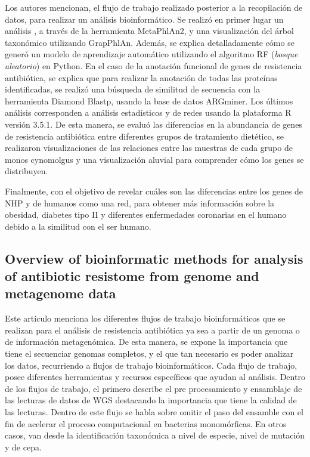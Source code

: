 \documentclass[12pt]{article}
\begin{document}
Los autores mencionan, el flujo de trabajo realizado posterior a la recopilación de datos,
para realizar un análisis bioinformático. Se realizó en primer lugar un análisis , a 
través de la herramienta MetaPhlAn2, y una visualización del árbol taxonómico utilizando 
GrapPhlAn. Además, se explica detalladamente cómo se generó un modelo de aprendizaje 
automático utilizando el algoritmo RF (\emph{bosque aleatorio}) en Python.  En el caso de la 
anotación funcional de genes de resistencia antibiótica, se explica que 
para realizar la anotación de todas las proteínas identificadas, se realizó una 
búsqueda de similitud de secuencia con la herramienta Diamond Blastp, usando la 
base de datos ARGminer. Los últimos análisis corresponden a análisis estadísticos y 
de redes usando la plataforma R versión 3.5.1. De esta manera, se evaluó las diferencias en 
la abundancia de genes de resistencia antibiótica entre diferentes grupos de 
tratamiento dietético, se realizaron visualizaciones de las relaciones entre las 
muestras de cada grupo de monos cynomolgus y una visualización aluvial para comprender cómo 
los genes se distribuyen.

Finalmente, con el objetivo de revelar cuáles son las diferencias entre los genes de 
NHP y de humanos como una red, para obtener más información sobre la obesidad, 
diabetes tipo II y diferentes enfermedades coronarias en el humano debido a la similitud 
con el ser humano.

\subsection*{Overview of bioinformatic methods for analysis of antibiotic resistome from genome and metagenome data}
Este artículo menciona los diferentes flujos de trabajo bioinformáticos que se realizan 
para el análisis de resistencia antibiótica ya sea a partir de un genoma o de información 
metagenómica.  De esta manera, se expone la importancia que tiene el secuenciar genomas 
completos, y el que tan necesario es poder analizar los datos, recurriendo a flujos de 
trabajo bioinformáticos. Cada flujo de trabajo, posee diferentes herramientas y recursos 
específicos que ayudan al análisis. Dentro de los flujos de trabajo, el primero describe el 
pre procesamiento y ensamblaje de las lecturas de datos de WGS destacando la importancia 
que tiene la calidad de las lecturas. Dentro de este flujo se habla sobre omitir el 
paso del ensamble con el fin de acelerar el proceso computacional en bacterias monomórficas. 
En otros casos, van desde la identificación taxonómica a nivel de especie, nivel de mutación 
y de cepa.
\end{document}
